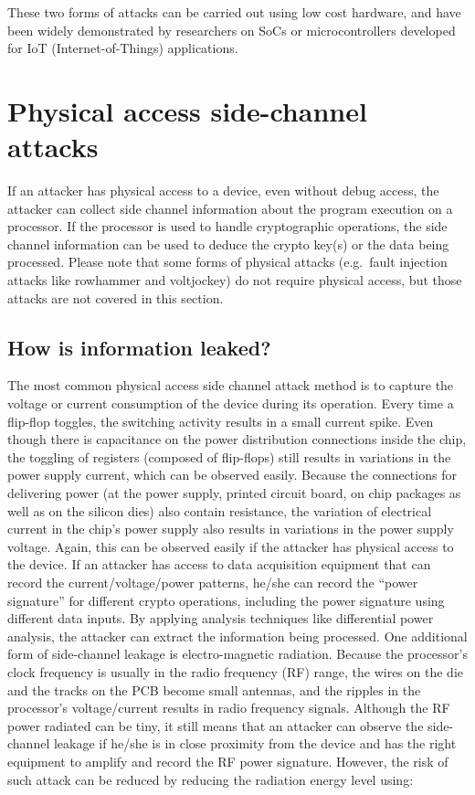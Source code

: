 \documentclass[a4paper,]{report}
\begin{document}
These two forms of attacks can be carried out using low cost hardware,
and have been widely demonstrated by researchers on SoCs or
microcontrollers developed for IoT (Internet-of-Things) applications.

\hypertarget{physical-access-side-channel-attacks-1}{%
\section{Physical access side-channel
attacks}\label{physical-access-side-channel-attacks-1}}

If an attacker has physical access to a device, even without debug
access, the attacker can collect side channel information about the
program execution on a processor. If the processor is used to handle
cryptographic operations, the side channel information can be used to
deduce the crypto key(s) or the data being processed. Please note that
some forms of physical attacks (e.g.~fault injection attacks like
rowhammer and voltjockey) do not require physical access, but those
attacks are not covered in this section.

\hypertarget{how-is-information-leaked}{%
\subsection{How is information
leaked?}\label{how-is-information-leaked}}

The most common physical access side channel attack method is to capture
the voltage or current consumption of the device during its operation.
Every time a flip-flop toggles, the switching activity results in a
small current spike. Even though there is capacitance on the power
distribution connections inside the chip, the toggling of registers
(composed of flip-flops) still results in variations in the power supply
current, which can be observed easily. Because the connections for
delivering power (at the power supply, printed circuit board, on chip
packages as well as on the silicon dies) also contain resistance, the
variation of electrical current in the chip's power supply also results
in variations in the power supply voltage. Again, this can be observed
easily if the attacker has physical access to the device. If an attacker
has access to data acquisition equipment that can record the
current/voltage/power patterns, he/she can record the ``power
signature'' for different crypto operations, including the power
signature using different data inputs. By applying analysis techniques
like differential power analysis, the attacker can extract the
information being processed. One additional form of side-channel leakage
is electro-magnetic radiation. Because the processor's clock frequency
is usually in the radio frequency (RF) range, the wires on the die and
the tracks on the PCB become small antennas, and the ripples in the
processor's voltage/current results in radio frequency signals. Although
the RF power radiated can be tiny, it still means that an attacker can
observe the side-channel leakage if he/she is in close proximity from
the device and has the right equipment to amplify and record the RF
power signature. However, the risk of such attack can be reduced by
reducing the radiation energy level using:
\end{document}
